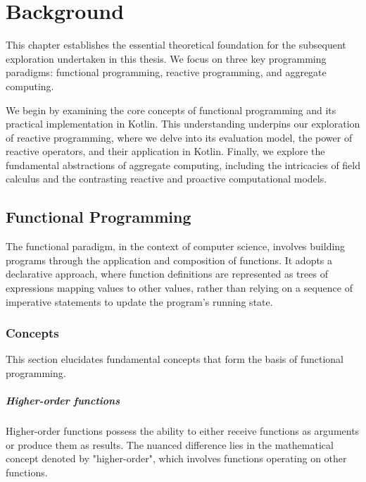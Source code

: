 
\chapter{Background}
\label{chap:background}

This chapter establishes the essential theoretical foundation for the subsequent exploration undertaken in this thesis. We focus on three key programming paradigms: functional programming, reactive programming, and aggregate computing.

We begin by examining the core concepts of functional programming and its practical implementation in Kotlin. This understanding underpins our exploration of reactive programming, where we delve into its evaluation model, the power of reactive operators, and their application in Kotlin. Finally, we explore the fundamental abstractions of aggregate computing, including the intricacies of field calculus and the contrasting reactive and proactive computational models.

\section{Functional Programming}

The functional paradigm, in the context of computer science, involves building programs through the application and composition of functions. It adopts a declarative approach, where function definitions are represented as trees of expressions mapping values to other values, rather than relying on a sequence of imperative statements to update the program's running state.

\subsection{Concepts}

This section elucidates fundamental concepts that form the basis of functional programming.

\paragraph{Higher-order functions}

Higher-order functions possess the ability to either receive functions as arguments or produce them as results. The nuanced difference lies in the mathematical concept denoted by "higher-order", which involves functions operating on other functions.

